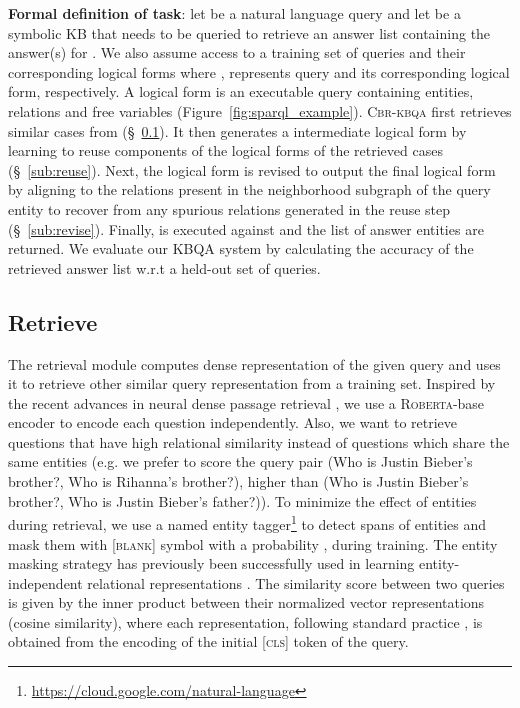 \documentclass[11pt]{article}
\newcommand{\roberta}{\textsc{Roberta}\xspace}
\newcommand{\alg}{\textsc{Cbr-kbqa}\xspace}
\begin{document}
\noindent\textbf{Formal definition of task}: let  be a natural language query and let  be a symbolic KB that needs to be queried to retrieve an answer list  containing the answer(s) for . We also assume access to a training set  of queries and their corresponding logical forms where ,   represents query and its corresponding logical form, respectively. A logical form is an executable query containing entities, relations and free variables (Figure~\ref{fig:sparql_example}). \alg first retrieves  similar cases   from  (\S~\ref{sub:retrieval}). It then generates a intermediate logical form  by learning to reuse components of the logical forms of the retrieved cases (\S~\ref{sub:reuse}). Next, the logical form  is revised to output the final logical form  by aligning to the relations present in the neighborhood subgraph of the query entity to recover from any spurious relations generated in the reuse step (\S~\ref{sub:revise}). Finally,  is executed against  and the list of answer entities are returned. We evaluate our KBQA system by calculating the accuracy of the retrieved answer list w.r.t a held-out set of queries.

\subsection{Retrieve}
\label{sub:retrieval}
The retrieval module computes dense representation of the given query and uses it to retrieve other similar query representation from a training set. Inspired by the recent advances in neural dense passage retrieval \cite{das2019multi,karpukhin2020dense}, we use a \roberta-base encoder to encode each question independently. Also, we want to retrieve questions that have high relational similarity instead of questions which share the same entities (e.g. we prefer to score the query pair (Who is Justin Bieber's brother?, Who is Rihanna's brother?), higher than (Who is Justin Bieber's brother?, Who is Justin Bieber's father?)). To minimize the effect of entities during retrieval, we use a named entity tagger\footnote{\url{https://cloud.google.com/natural-language}} to detect spans of entities and mask them with \textsc{[blank]} symbol with a probability , during training. The entity masking strategy has previously been successfully used in learning entity-independent relational representations \cite{soares2019matching}. The similarity score between two queries is given by the inner product between their normalized vector representations (cosine similarity), where each representation, following standard practice \cite{guu2020realm}, is obtained from the encoding of the initial \textsc{[cls]} token of the query. 
\end{document}
